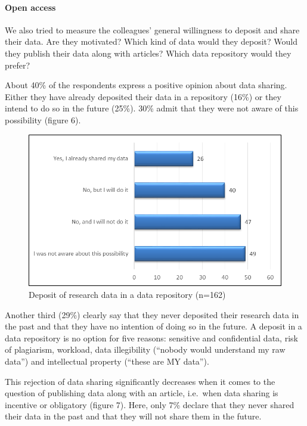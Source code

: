 \documentclass[a4paper,
fontsize=11pt,
oneside,
numbers=noperiodatend,
parskip=half-,
bibliography=totoc,
final
]{scrartcl}
\begin{document}
\paragraph{Open access}\label{open-access}

We also tried to measure the colleagues' general willingness to deposit
and share their data. Are they motivated? Which kind of data would they
deposit? Would they publish their data along with articles? Which data
repository would they prefer?

About 40\% of the respondents express a positive opinion about data
sharing. Either they have already deposited their data in a repository
(16\%) or they intend to do so in the future (25\%). 30\% admit that
they were not aware of this possibility (figure 6).

\begin{figure}[htbp]
\centering
\includegraphics{figures/media/image6.png}
\caption{Deposit of research data in a data repository (n=162)}
\end{figure}

Another third (29\%) clearly say that they never deposited their
research data in the past and that they have no intention of doing so in
the future. A deposit in a data repository is no option for five
reasons: sensitive and confidential data, risk of plagiarism, workload,
data illegibility (\enquote{nobody would understand my raw data}) and
intellectual property (\enquote{these are MY data}).

This rejection of data sharing significantly decreases when it comes to
the question of publishing data along with an article, i.e.~when data
sharing is incentive or obligatory (figure 7). Here, only 7\% declare
that they never shared their data in the past and that they will not
share them in the future.
\end{document}

